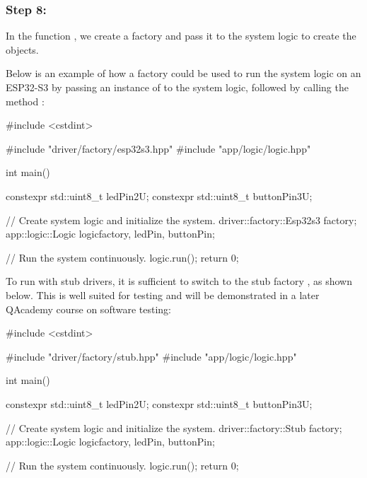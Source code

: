 \subsubsection{Step 8: }
In the function , we create a factory and pass it to the system logic to create the
objects.

Below is an example of how a factory could be used to run the system logic on an ESP32-S3 by
passing an instance of  to the system logic, followed by calling the
method :

\begin{cppcode}
#include <cstdint>

#include "driver/factory/esp32s3.hpp"
#include "app/logic/logic.hpp"

int main()
{
    constexpr std::uint8_t ledPin{2U};
    constexpr std::uint8_t buttonPin{3U};

    // Create system logic and initialize the system.
    driver::factory::Esp32s3 factory{};
    app::logic::Logic logic{factory, ledPin, buttonPin};

    // Run the system continuously.
    logic.run();
    return 0;
}
\end{cppcode}

\noindent To run with stub drivers, it is sufficient to switch to the stub factory
, as shown below. This is well suited for testing and will be
demonstrated in a later QAcademy course on software testing:

\begin{cppcode}
#include <cstdint>

#include "driver/factory/stub.hpp"
#include "app/logic/logic.hpp"

int main()
{
    constexpr std::uint8_t ledPin{2U};
    constexpr std::uint8_t buttonPin{3U};

    // Create system logic and initialize the system.
    driver::factory::Stub factory{};
    app::logic::Logic logic{factory, ledPin, buttonPin};

    // Run the system continuously.
    logic.run();
    return 0;
}
\end{cppcode}
